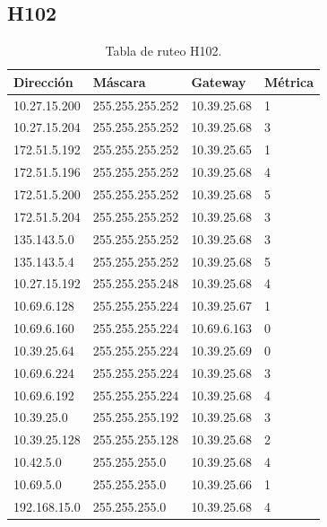 \documentclass[12pt,titlepage]{article}
\begin{document}
\subsection{H102}
\begin{table}
  \begin{center}
    \begin{tabular}{|l|l|l|l|}
      \hline
        \bf{Direcci\'on} & \bf{M\'ascara} & \bf{Gateway} & \bf{M\'etrica} \\
      \hline 
	10.27.15.200  & 255.255.255.252 & 10.39.25.68 & 1 \\
        10.27.15.204  & 255.255.255.252 & 10.39.25.68 & 3 \\
        172.51.5.192  & 255.255.255.252 & 10.39.25.65 & 1 \\
        172.51.5.196  & 255.255.255.252 & 10.39.25.68 & 4 \\
        172.51.5.200  & 255.255.255.252 & 10.39.25.68 & 5 \\
        172.51.5.204  & 255.255.255.252 & 10.39.25.68 & 3 \\
        135.143.5.0   & 255.255.255.252 & 10.39.25.68 & 3 \\
        135.143.5.4   & 255.255.255.252 & 10.39.25.68 & 5 \\ 	
	10.27.15.192  & 255.255.255.248 & 10.39.25.68 & 4 \\
	10.69.6.128   & 255.255.255.224 & 10.39.25.67 & 1 \\
        10.69.6.160   & 255.255.255.224 & 10.69.6.163 & 0 \\
	10.39.25.64   & 255.255.255.224 & 10.39.25.69 & 0 \\       
	10.69.6.224   & 255.255.255.224 & 10.39.25.68 & 3 \\
	10.69.6.192   & 255.255.255.224 & 10.39.25.68 & 4 \\	
	10.39.25.0    & 255.255.255.192 & 10.39.25.68 & 3 \\
	10.39.25.128  & 255.255.255.128 & 10.39.25.68 & 2 \\
	10.42.5.0     & 255.255.255.0 & 10.39.25.68 & 4 \\
        10.69.5.0     & 255.255.255.0 & 10.39.25.66 & 1 \\
        192.168.15.0  & 255.255.255.0 & 10.39.25.68 & 4 \\  
    \hline
    \end{tabular} \\
  \end{center}
  \caption{Tabla de ruteo H102.}
\end{table}
\FloatBarrier
\end{document}
